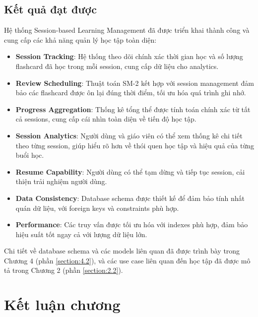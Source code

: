 \documentclass[../DoAn.tex]{subfiles}
\begin{document}
\subsection{Kết quả đạt được}
\label{subsection:5.5.3}

Hệ thống Session-based Learning Management đã được triển khai thành công và cung cấp các khả năng quản lý học tập toàn diện:

\begin{itemize}
    \item \textbf{Session Tracking}: Hệ thống theo dõi chính xác thời gian học và số lượng flashcard đã học trong mỗi session, cung cấp dữ liệu cho analytics.
    
    \item \textbf{Review Scheduling}: Thuật toán SM-2 kết hợp với session management đảm bảo các flashcard được ôn lại đúng thời điểm, tối ưu hóa quá trình ghi nhớ.
    
    \item \textbf{Progress Aggregation}: Thống kê tổng thể được tính toán chính xác từ tất cả sessions, cung cấp cái nhìn toàn diện về tiến độ học tập.
    
    \item \textbf{Session Analytics}: Người dùng và giáo viên có thể xem thống kê chi tiết theo từng session, giúp hiểu rõ hơn về thói quen học tập và hiệu quả của từng buổi học.
    
    \item \textbf{Resume Capability}: Người dùng có thể tạm dừng và tiếp tục session, cải thiện trải nghiệm người dùng.
    
    \item \textbf{Data Consistency}: Database schema được thiết kế để đảm bảo tính nhất quán dữ liệu, với foreign keys và constraints phù hợp.
    
    \item \textbf{Performance}: Các truy vấn được tối ưu hóa với indexes phù hợp, đảm bảo hiệu suất tốt ngay cả với lượng dữ liệu lớn.
\end{itemize}

Chi tiết về database schema và các models liên quan đã được trình bày trong Chương 4 (phần \ref{section:4.2}), và các use case liên quan đến học tập đã được mô tả trong Chương 2 (phần \ref{section:2.2}).

\section{Kết luận chương}
\end{document}
